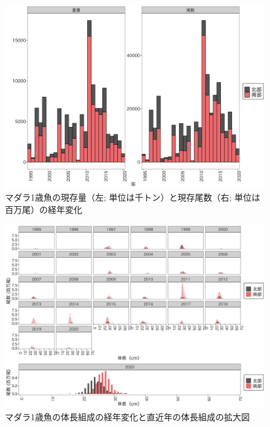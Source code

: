 \documentclass[11pt]{article} %
\begin{document}
\begin{linenumbers}
\begin{figure}[h]
  \centering
  \includegraphics[width = 14cm]{マダラ１＋trend.png}
  \caption{マダラ1歳魚の現存量（左; 単位は千トン）と現存尾数（右; 単位は百万尾）の経年変化}
\end{figure}

\begin{figure}[h]
  \centering
  \includegraphics[width = 14cm]{マダラ1+length.png}
  \caption{マダラ1歳魚の体長組成の経年変化と直近年の体長組成の拡大図}
\end{figure}


\end{linenumbers}
\end{document}
